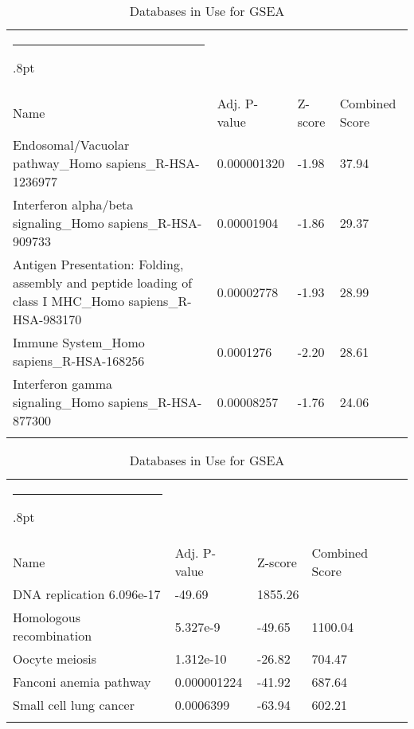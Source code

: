 \documentclass[3p,authoryear,preprint,12pt]{elsarticle}
\makeatletter
\def\hlinewd#1{%
  \noalign{\ifnum0=`}\fi\hrule \@height #1%
  \futurelet\reserved@a\@xhline}
\def\tbltoprule{\hlinewd{.8pt}\\[-12pt]}
\def\tblbottomrule{\noalign{\vspace*{6pt}}\hline\noalign{\vspace*{2pt}}}
\def\tblmidrule{\noalign{\vspace*{6pt}}\hline\noalign{\vspace*{2pt}}}
\makeatother
\begin{document}
\begin{table*}[!htbp]
	\caption{{Databases in Use for GSEA} }
	\label{tw-de478ae31cc6}
	\def\arraystretch{1}
	\ignorespaces 
	\centering 
	\begin{tabulary}{\linewidth}{p{\dimexpr.65\tabcolsep}p{\dimexpr.15\tabcolsep}p{\dimexpr.1\tabcolsep}p{\dimexpr.1\tabcolsep}}
		\tbltoprule Name & Adj. P-value & Z-score & Combined Score\\
		\tblmidrule
Endosomal/Vacuolar pathway\_Homo sapiens\_R-HSA-1236977 & 0.000001320 & -1.98 & 37.94 \\
Interferon alpha/beta signaling\_Homo sapiens\_R-HSA-909733 & 0.00001904 & -1.86 & 29.37 \\
Antigen Presentation: Folding, assembly and peptide loading of class I MHC\_Homo sapiens\_R-HSA-983170 & 0.00002778 & -1.93 & 28.99 \\
Immune System\_Homo sapiens\_R-HSA-168256 & 0.0001276 & -2.20 & 28.61 \\
Interferon gamma signaling\_Homo sapiens\_R-HSA-877300 & 0.00008257 & -1.76 & 24.06 \\
		\tblbottomrule
	\end{tabulary}\par 
\end{table*}
\begin{table*}[!htbp]
	\caption{{Databases in Use for GSEA} }
	\label{tw-de478ae31cc6}
	\def\arraystretch{1}
	\ignorespaces 
	\centering 
	\begin{tabulary}{\linewidth}{p{\dimexpr.65\tabcolsep}p{\dimexpr.15\tabcolsep}p{\dimexpr.1\tabcolsep}p{\dimexpr.1\tabcolsep}}
		\tbltoprule Name & Adj. P-value & Z-score & Combined Score\\
		\tblmidrule
DNA replication	6.096e-17 & -49.69 & 1855.26 &  \\
Homologous recombination & 5.327e-9 & -49.65 & 1100.04 \\
Oocyte meiosis & 1.312e-10 & -26.82 & 704.47 \\
Fanconi anemia pathway & 0.000001224 & -41.92 & 687.64 \\
Small cell lung cancer & 0.0006399 & -63.94 & 602.21 \\
		\tblbottomrule
	\end{tabulary}\par 
\end{table*}
\end{document}
